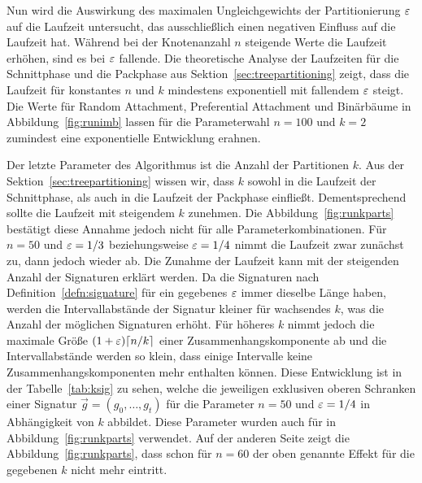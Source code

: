 Nun wird die Auswirkung des maximalen Ungleichgewichts der Partitionierung $\varepsilon$ auf die Laufzeit untersucht, das ausschließlich einen negativen Einfluss auf die Laufzeit hat.
Während bei der Knotenanzahl $n$ steigende Werte die Laufzeit erhöhen, sind es bei $\varepsilon$ fallende.
Die theoretische Analyse der Laufzeiten für die Schnittphase und die Packphase aus Sektion~\ref{sec:treepartitioning} zeigt, dass die Laufzeit für konstantes $n$ und $k$ mindestens exponentiell mit fallendem $\varepsilon$ steigt.
Die Werte für Random Attachment, Preferential Attachment und Binärbäume in Abbildung~\ref{fig:runimb} lassen für die Parameterwahl $n = 100$ und $k = 2$ zumindest eine exponentielle Entwicklung erahnen.

Der letzte Parameter des Algorithmus ist die Anzahl der Partitionen $k$. 
Aus der Sektion~\ref{sec:treepartitioning} wissen wir, dass $k$ sowohl in die Laufzeit der Schnittphase, als auch in die Laufzeit der Packphase einfließt.
Dementsprechend sollte die Laufzeit mit steigendem $k$ zunehmen.
Die Abbildung~\ref{fig:runkparts} bestätigt diese Annahme jedoch nicht für alle Parameterkombinationen.
Für $n=50$ und $\varepsilon=1/3$ beziehungsweise $\varepsilon=1/4$ nimmt die Laufzeit zwar zunächst zu, dann jedoch wieder ab.
Die Zunahme der Laufzeit kann mit der steigenden Anzahl der Signaturen erklärt werden.
Da die Signaturen nach Definition~\ref{defn:signature} für ein gegebenes $\varepsilon$ immer dieselbe Länge haben, werden die Intervallabstände der Signatur kleiner für wachsendes $k$, was die Anzahl der möglichen Signaturen erhöht.
Für höheres $k$ nimmt jedoch die maximale Größe $(1 + \varepsilon) \lceil n/k\rceil$ einer Zusammenhangskomponente ab und die Intervallabstände werden so klein, dass einige Intervalle keine Zusammenhangskomponenten mehr enthalten können. 
Diese Entwicklung ist in der Tabelle~\ref{tab:ksig} zu sehen, welche die jeweiligen exklusiven oberen Schranken einer Signatur $\vec{g} = (g_0, \ldots, g_t)$ für die Parameter $n = 50$ und $\varepsilon = 1/4$ in Abhängigkeit von $k$ abbildet.
Diese Parameter wurden auch für in Abbildung~\ref{fig:runkparts} verwendet.
Auf der anderen Seite zeigt die Abbildung~\ref{fig:runkparts}, dass schon für $n=60$ der oben genannte Effekt für die gegebenen $k$ nicht mehr eintritt. 

